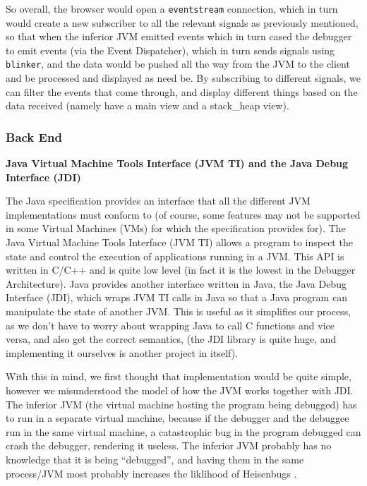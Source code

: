 \documentclass[11pt, a4paper]{article}
\begin{document}
So overall, the browser would open a \texttt{eventstream} connection, which in
turn would create a new subscriber to all the relevant signals as previously
mentioned, so that when the inferior JVM emitted events which in turn cased the
debugger to emit events (via the Event Dispatcher), which in turn sends signals
using \texttt{blinker}, and the data would be pushed all the way from the JVM to
the client and be processed and displayed as need be. By subscribing to
different signals, we can filter the events that come through, and display
different things based on the data received (namely have a main view and a
stack\_heap view).

\subsubsection{Back End}
\textbf{Java Virtual Machine Tools Interface (JVM TI) and the Java Debug Interface (JDI)}

The Java specification provides an interface that all the different JVM implementations must conform to (of course, some features may not be supported in some Virtual Machines (VMs) for which the specification provides for).
The Java Virtual Machine Tools Interface (JVM TI) \cite{jvmti} allows a program to inspect the state and control the execution of applications running in a JVM.
This API is written in C/C++ and is quite low level (in fact it is the lowest in the Debugger Architecture).
Java provides another interface written in Java, the Java Debug Interface (JDI), which wraps JVM TI calls in Java so that a Java program can manipulate the state of another JVM.
This is useful as it simplifies our process, as we don't have to worry about wrapping Java to call C functions and vice versa, and also get the correct semantics, (the JDI library is quite huge, and implementing it ourselves is another project in itself).

With this in mind, we first thought that implementation would be quite simple, however we misunderstood the model of how the JVM works together with JDI.
The inferior JVM (the virtual machine hosting the program being debugged) has to run in a separate virtual machine, because if the debugger and the debuggee run in the same virtual machine, a catastrophic bug in the program debugged can crash the debugger, rendering it useless.
The inferior JVM probably has no knowledge that it is being ``debugged'', and having them in the same process/JVM most probably increases the liklihood of Heisenbugs \cite{heisenbug}.
\end{document}
